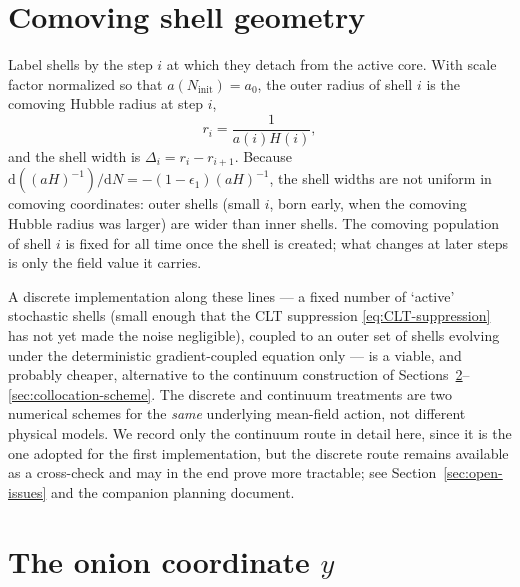 \documentclass[a4paper,11pt]{article}
\renewcommand{\d}{\mathrm{d}}
\newenvironment{panel}{\begin{tcolorbox}[enhanced,breakable,colback=gray!10,colframe=gray!30]\small}{\end{tcolorbox}}
\newcommand{\Ny}{N}                          %
\newcommand{\Ninit}{N_{\mathrm{init}}}       %
\newcommand{\epsSR}{\epsilon_1}              %
\newcommand{\Hub}{H}                         %
\newcommand{\sfactor}{a}                     %
\newcommand{\rad}{r}                         %
\newcommand{\yco}{y}                         %
\newcommand{\aH}[1][]{(\sfactor \Hub)#1}     %
\begin{document}
\section{Comoving shell geometry}
\label{sec:geometry}

Label shells by the step $i$ at which they detach from the active core.
With scale factor normalized so that $\sfactor(\Ninit) = \sfactor_0$, the
outer radius of shell $i$ is the comoving Hubble radius at step $i$,
\begin{equation}
    \rad_i = \frac{1}{\sfactor(i)\Hub(i)} ,
\end{equation}
and the shell width is $\Delta_i = \rad_i - \rad_{i+1}$. Because
$\d(\aH[^{-1}])/\d\Ny = -(1-\epsSR)\aH[^{-1}]$, the shell widths are not
uniform in comoving coordinates: outer shells (small $i$, born early, when
the comoving Hubble radius was larger) are wider than inner shells. The
comoving population of shell $i$ is fixed for all time once the shell is
created; what changes at later steps is only the field value it carries.

\begin{panel}
A discrete implementation along these lines --- a fixed number of
`active' stochastic shells (small enough that the CLT suppression
\eqref{eq:CLT-suppression} has not yet made the noise negligible), coupled
to an outer set of shells evolving under the deterministic gradient-coupled
equation only --- is a viable, and probably cheaper, alternative to the
continuum construction of Sections~\ref{sec:coordinate}--\ref{sec:collocation-scheme}.
The discrete and continuum treatments are two numerical schemes for the
\emph{same} underlying mean-field action, not different physical models. We
record only the continuum route in detail here, since it is the one
adopted for the first implementation, but the discrete route remains
available as a cross-check and may in the end prove more tractable; see
Section~\ref{sec:open-issues} and the companion planning document.
\end{panel}

\section{The onion coordinate $\yco$}
\label{sec:coordinate}
\end{document}
